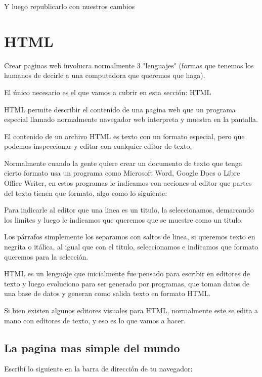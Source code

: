 \documentclass[letterpaper,10pt,spanish]{sphinxmanual}
\begin{document}
Y luego republicarlo con nuestros cambios


\chapter{HTML}
\label{\detokenize{html::doc}}\label{\detokenize{html:html}}
Crear paginas web involucra normalmente 3 "lenguajes" (formas que tenemos los humanos de decirle a una computadora que queremos que haga).

El único necesario es el que vamos a cubrir en esta sección: HTML

HTML permite describir el contenido de una pagina web que un programa especial
llamado normalmente navegador web interpreta y muestra en la pantalla.

El contenido de un archivo HTML es texto con un formato especial, pero que podemos
inspeccionar y editar con cualquier editor de texto.

Normalmente cuando la gente quiere crear un documento de texto que tenga cierto
formato usa un programa como Microsoft Word, Google Docs o Libre Office Writer,
en estos programas le indicamos con acciones al editor que partes del texto tienen
que formato, algo como lo siguiente:

\begin{figure}[htbp]
\centering

\noindent{}
\end{figure}

Para indicarle al editor que una linea es un titulo, la seleccionamos, demarcando
los limites y luego le indicamos que queremos que se muestre como un titulo.

Los párrafos simplemente los separamos con saltos de linea, si queremos texto
en negrita o itálica, al igual que con el titulo, seleccionamos e indicamos que
formato queremos para la selección.

HTML es un lenguaje que inicialmente fue pensado para escribir en editores de
texto y luego evoluciono para ser generado por programas, que toman datos de
una base de datos y generan como salida texto en formato HTML.

Si bien existen algunos editores visuales para HTML, normalmente este se edita
a mano con editores de texto, y eso es lo que vamos a hacer.


\section{La pagina mas simple del mundo}
\label{\detokenize{html:la-pagina-mas-simple-del-mundo}}
Escribí lo siguiente en la barra de dirección de tu navegador:
\end{document}
